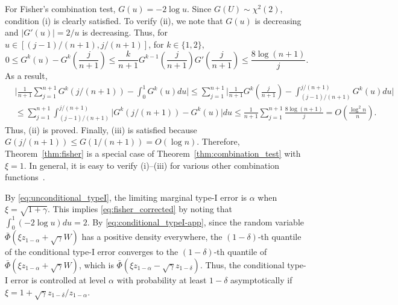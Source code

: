 \begin{remark}
For Fisher's combination test, $G(u) = -2\log u$. Since $G(U)\sim \chi^2(2)$, condition (i) is clearly satisfied. To verify (ii), we note that $G(u)$ is decreasing and $|G'(u)| = 2 / u$ is decreasing. Thus, for $u\in [(j-1)/(n+1), j/(n+1)]$, for $k\in \{1, 2\}$,
\[0\le G^{k}(u) - G^{k}\left(\frac{j}{n+1}\right)\le \frac{k}{n+1}G^{k-1}\left(\frac{j}{n+1}\right)G'\left(\frac{j}{n+1}\right)\le \frac{8\log(n + 1)}{j}.\]
As a result,
\begin{align*}
&\bigg|\frac{1}{n+1}\sum_{j=1}^{n+1}G^k\left(j / (n + 1)\right) - \int_{0}^{1}G^{k}(u)du\bigg| \le \sum_{j=1}^{n+1}\bigg|\frac{1}{n+1}G^{k}\left(\frac{j}{n+1}\right) - \int_{(j-1)/(n+1)}^{j/(n+1)}G^{k}(u)du\bigg|\\
& \le \sum_{j=1}^{n+1}\int_{(j-1)/(n+1)}^{j/(n+1)}\big|G^k\left(j / (n + 1)\right) - G^{k}(u)\big|du \le \frac{1}{n+1}\sum_{j=1}^{n+1}\frac{8\log(n + 1)}{j} = O\left(\frac{\log^2 n}{n}\right).
\end{align*}
Thus, (ii) is proved. Finally, (iii) is satisfied because $G(j/(n+1))\le G(1/(n+1)) = O(\log n)$. Therefore, Theorem~\ref{thm:fisher} is a special case of Theorem~\ref{thm:combination_test} with $\xi = 1$. In general, it is easy to verify (i)--(iii) for various other combination functions~\cite{liptak1958combination, van1967combination, vovk2020combining}.
\end{remark}

\begin{remark}
By \eqref{eq:unconditional_typeI}, the limiting marginal type-I error is $\alpha$ when $\xi = \sqrt{1 + \gamma}$. This implies \eqref{eq:fisher_corrected} by noting that $\int_0^1 (-2\log u)du = 2$. By \eqref{eq:conditional_typeI-app}, since the random variable $\bar{\Phi}(\xi z_{1 - \alpha} + \sqrt{\gamma}W)$ has a positive density everywhere, the $(1 - \delta)$-th quantile of the conditional type-I error converges to the $(1 - \delta)$-th quantile of $\bar{\Phi}(\xi z_{1 - \alpha} + \sqrt{\gamma}W)$, which is $\bar{\Phi}(\xi z_{1 - \alpha} - \sqrt{\gamma}z_{1 - \delta})$. Thus, the conditional type-I error is controlled at level $\alpha$ with probability at least $1 - \delta$ asymptotically if $\xi = 1 + \sqrt{\gamma}z_{1 - \delta}/ z_{1 - \alpha}$.
\end{remark}

